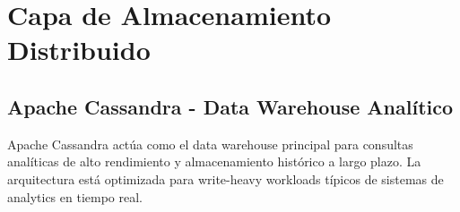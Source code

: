 \section{Capa de Almacenamiento Distribuido}
\label{sec:almacenamiento}

\subsection{Apache Cassandra - Data Warehouse Analítico}
\label{subsec:cassandra}

Apache Cassandra actúa como el data warehouse principal para consultas analíticas de alto rendimiento y almacenamiento histórico a largo plazo. La arquitectura está optimizada para write-heavy workloads típicos de sistemas de analytics en tiempo real.

\vspace{0.3cm}


